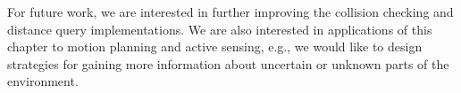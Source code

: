 For future work, we are interested in further improving the collision
checking and distance query implementations. We are also interested in
applications of this chapter to motion planning and active sensing, e.g., we would like
to design strategies for gaining more information about uncertain or
unknown parts of the environment.




